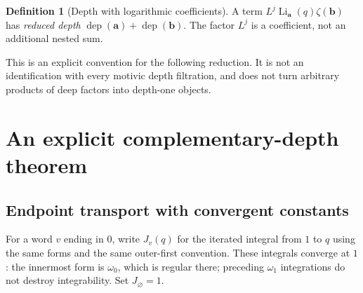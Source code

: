 \documentclass[11pt]{article}
\numberwithin{equation}{section}
\theoremstyle{definition}\newtheorem{definition}[theorem]{Definition}
\theoremstyle{remark}\newtheorem{remark}[theorem]{Remark}
\DeclareMathOperator{\Li}{Li}
\DeclareMathOperator{\dep}{dep}
\newcommand{\emp}{\varnothing}\newcommand{\sh}{\mathbin{\amalg}}
\begin{document}
\begin{definition}[Depth with logarithmic coefficients]
A term $L^j\Li_{\boldsymbol a}(q)\zeta(\boldsymbol b)$ has
\emph{reduced depth} $\dep(\boldsymbol a)+\dep(\boldsymbol b)$.
The factor $L^j$ is a coefficient, not an additional nested sum.
\end{definition}
This is an explicit convention for the following reduction. It is not
an identification with every motivic depth filtration, and does not
turn arbitrary products of deep factors into depth-one objects.

\section{An explicit complementary-depth theorem}

\subsection{Endpoint transport with convergent constants}
For a word $v$ ending in $0$, write $J_v(q)$ for the iterated integral
from $1$ to $q$ using the same forms and the same outer-first convention.
These integrals converge at $1$: the innermost form is $\omega_0$, which
is regular there; preceding $\omega_1$ integrations do not destroy
integrability. Set $J_\emp=1$.
\end{document}
